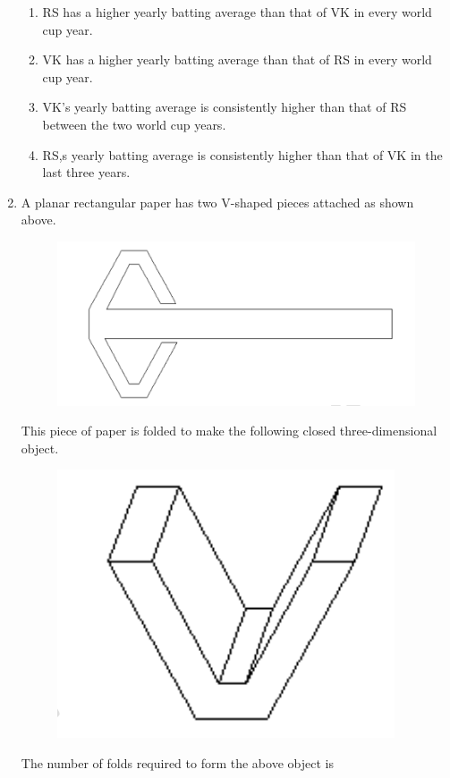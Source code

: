 \documentclass[journal]{IEEEtran}
\begin{document}
\begin{enumerate}[leftmargin=0pt]
\vspace{2mm}

\begin{enumerate}

\item RS has a higher yearly batting average than that of VK in every world cup year.
\item VK has a higher yearly batting average than that of RS in every world cup year.
\item VK's yearly batting average is consistently higher than that of RS between the two world cup years.
\item RS,s yearly batting average is consistently higher than that of VK in the last three years.

\end{enumerate}

\hfill{}

\vspace{4mm}

\item


A planar rectangular paper has two V-shaped pieces attached as shown above. 
\begin{figure}[h]
\centering
\includegraphics[width=0.5\columnwidth]{Figs/image (61).png}
\caption*{}
\label{fig:9}
\end{figure}
This piece of paper is folded to make the following closed three-dimensional object.
\begin{figure}[h]
\centering
\includegraphics[width=0.3\columnwidth]{Figs/image (62).png}
\caption*{}
\label{fig:9}
\end{figure}

The number of folds required to form the above object is 

\vspace{2mm}


\end{enumerate}
\end{document}
